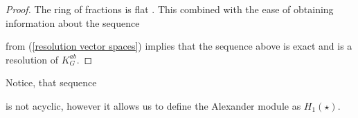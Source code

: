 \begin{proof}
  The ring of fractions is flat \cite[Chapter~3]{atiyah}. This combined with the ease of obtaining information about the sequence 
  \begin{center}
  \end{center}
  from (\ref{resolution vector spaces}) implies that the sequence above is exact and is a resolution of $K_G^{ab}$.



%
%
%
\end{proof}

Notice, that sequence
\begin{center}
\end{center}
is not acyclic, however it allows us to define the Alexander module as $H_1(\star)$.
